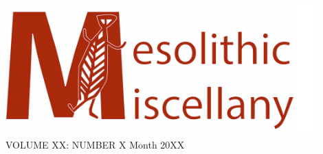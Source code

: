 \documentclass[12pt,a4paper]{article}
\newcommand{\titlesize}{\fontsize{22.0}{20pt}\selectfont}
\begin{document}
\begin{sf}
\begin{center}
\includegraphics[height=50mm]{MM_Logo}\\
\titlesize\color{MesoRed}VOLUME XX: NUMBER X Month 20XX \par
\end{center}
\end{sf}

\end{document}
